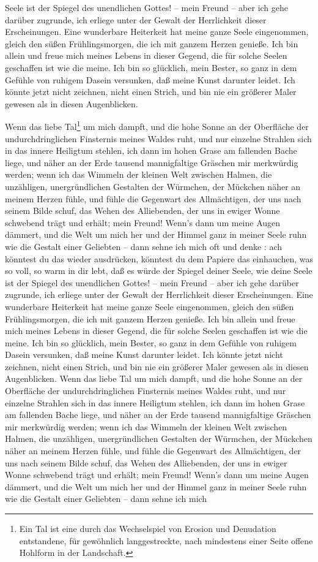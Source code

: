 \documentclass{scrreprt}
\begin{document}
Seele ist der Spiegel des unendlichen Gottes! – mein Freund – aber ich gehe darüber zugrunde, ich erliege unter der Gewalt der Herrlichkeit dieser Erscheinungen. Eine wunderbare Heiterkeit hat meine ganze Seele eingenommen, gleich den süßen Frühlingsmorgen, die ich mit ganzem Herzen genieße. Ich bin allein und freue mich meines Lebens in dieser Gegend, die für solche Seelen geschaffen ist wie die meine. Ich bin so glücklich, mein Bester, so ganz in dem Gefühle von ruhigem Dasein versunken, daß meine Kunst darunter leidet. Ich könnte jetzt nicht zeichnen, nicht einen Strich, und bin nie ein größerer Maler gewesen als in diesen Augenblicken.
	
	 Wenn das liebe Tal\footnote{Ein Tal ist eine durch das Wechselspiel von Erosion und Denudation entstandene, für gewöhnlich langgestreckte, nach mindestens einer Seite offene Hohlform in der Landschaft.} um mich dampft, und die hohe Sonne an der Oberfläche der undurchdringlichen Finsternis meines Waldes ruht, und nur einzelne Strahlen sich in das innere Heiligtum stehlen, ich dann im hohen Grase am fallenden Bache liege, und näher an der Erde tausend mannigfaltige Gräschen mir merkwürdig werden; wenn ich das Wimmeln der kleinen Welt zwischen Halmen, die unzähligen, unergründlichen Gestalten der Würmchen, der Mückchen näher an meinem Herzen fühle, und fühle die Gegenwart des Allmächtigen, der uns nach seinem Bilde schuf, das Wehen des Alliebenden, der uns in ewiger Wonne schwebend trägt und erhält; mein Freund! Wenn’s dann um meine Augen dämmert, und die Welt um mich her und der Himmel ganz in meiner Seele ruhn wie die Gestalt einer Geliebten – dann sehne ich mich oft und denke : ach könntest du das wieder ausdrücken, könntest du dem Papiere das einhauchen, was so voll, so warm in dir lebt, daß es würde der Spiegel deiner Seele, wie deine Seele ist der Spiegel des unendlichen Gottes! – mein Freund – aber ich gehe darüber zugrunde, ich erliege unter der Gewalt der Herrlichkeit dieser Erscheinungen. Eine wunderbare Heiterkeit hat meine ganze Seele eingenommen, gleich den süßen Frühlingsmorgen, die ich mit ganzem Herzen genieße. Ich bin allein und freue mich meines Lebens in dieser Gegend, die für solche Seelen geschaffen ist wie die meine. Ich bin so glücklich, mein Bester, so ganz in dem Gefühle von ruhigem Dasein versunken, daß meine Kunst darunter leidet. Ich könnte jetzt nicht zeichnen, nicht einen Strich, und bin nie ein größerer Maler gewesen als in diesen Augenblicken. Wenn das liebe Tal um mich dampft, und die hohe Sonne an der Oberfläche der undurchdringlichen Finsternis meines Waldes ruht, und nur einzelne Strahlen sich in das innere Heiligtum stehlen, ich dann im hohen Grase am fallenden Bache liege, und näher an der Erde tausend mannigfaltige Gräschen mir merkwürdig werden; wenn ich das Wimmeln der kleinen Welt zwischen Halmen, die unzähligen, unergründlichen Gestalten der Würmchen, der Mückchen näher an meinem Herzen fühle, und fühle die Gegenwart des Allmächtigen, der uns nach seinem Bilde schuf, das Wehen des Alliebenden, der uns in ewiger Wonne schwebend trägt und erhält; mein Freund! Wenn’s dann um meine Augen dämmert, und die Welt um mich her und der Himmel ganz in meiner Seele ruhn wie die Gestalt einer Geliebten – dann sehne ich mich 
\end{document}
